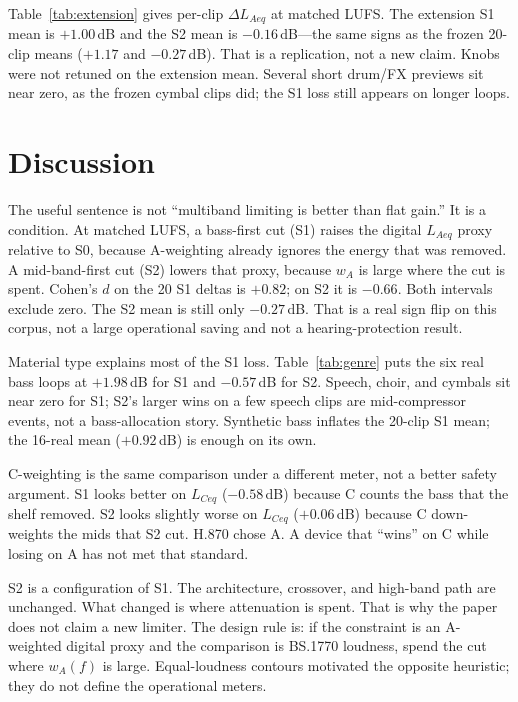 \documentclass[12pt,journal,onecolumn]{IEEEtran}
\begin{document}
Table~\ref{tab:extension} gives per-clip $\Delta L_{Aeq}$ at matched LUFS. The extension S1 mean is $+1.00$\,dB and the S2 mean is $-0.16$\,dB---the same signs as the frozen 20-clip means ($+1.17$ and $-0.27$\,dB). That is a replication, not a new claim. Knobs were not retuned on the extension mean. Several short drum/FX previews sit near zero, as the frozen cymbal clips did; the S1 loss still appears on longer loops.



\section{Discussion}
\label{sec:discuss}

The useful sentence is not ``multiband limiting is better than flat gain.'' It is a condition. At matched LUFS, a bass-first cut (S1) raises the digital $L_{Aeq}$ proxy relative to S0, because A-weighting already ignores the energy that was removed. A mid-band-first cut (S2) lowers that proxy, because $w_A$ is large where the cut is spent. Cohen's $d$ on the 20 S1 deltas is $+0.82$; on S2 it is $-0.66$. Both intervals exclude zero. The S2 mean is still only $-0.27$\,dB. That is a real sign flip on this corpus, not a large operational saving and not a hearing-protection result.

Material type explains most of the S1 loss. Table~\ref{tab:genre} puts the six real bass loops at $+1.98$\,dB for S1 and $-0.57$\,dB for S2. Speech, choir, and cymbals sit near zero for S1; S2's larger wins on a few speech clips are mid-compressor events, not a bass-allocation story. Synthetic bass inflates the 20-clip S1 mean; the 16-real mean ($+0.92$\,dB) is enough on its own.

C-weighting is the same comparison under a different meter, not a better safety argument. S1 looks better on $L_{Ceq}$ ($-0.58$\,dB) because C counts the bass that the shelf removed. S2 looks slightly worse on $L_{Ceq}$ ($+0.06$\,dB) because C down-weights the mids that S2 cut. H.870 chose A. A device that ``wins'' on C while losing on A has not met that standard.

S2 is a configuration of S1. The architecture, crossover, and high-band path are unchanged. What changed is where attenuation is spent. That is why the paper does not claim a new limiter. The design rule is: if the constraint is an A-weighted digital proxy and the comparison is BS.1770 loudness, spend the cut where $w_A(f)$ is large. Equal-loudness contours motivated the opposite heuristic; they do not define the operational meters.
\end{document}
